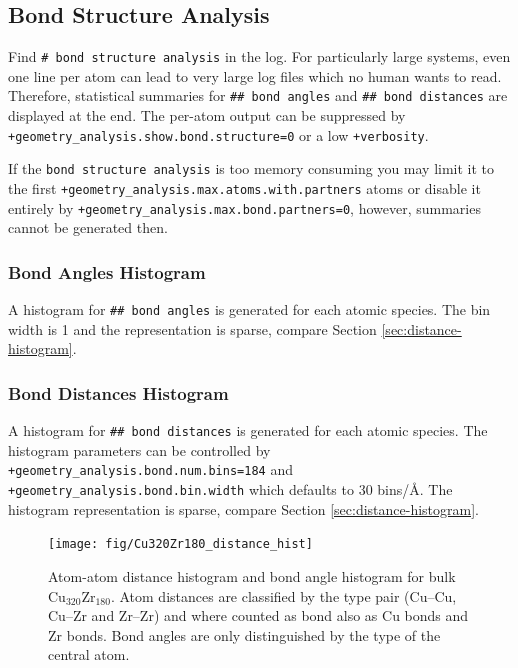 \documentclass[oribibl]{llncs}
\newcommand{\ttt}[1]{\texttt{#1}}
\begin{document}
\subsection{Bond Structure Analysis} \label{sec:bond-structure-analysis}
%
Find \ttt{\# bond structure analysis} in the log.
For particularly large systems, even one line per atom
can lead to very large log files which no human wants to read.
Therefore, statistical summaries 
for \ttt{\#\# bond angles} 
and \ttt{\#\# bond distances} are displayed at the end.
The per-atom output can be suppressed
by \ttt{+geometry\_analysis.show.bond.structure=0} or a low \ttt{+verbosity}.

\noindent
If the \ttt{bond structure analysis} is too memory consuming you may limit it to the first
\ttt{+geometry\_analysis.max.atoms.with.partners} atoms
or disable it entirely by \ttt{+geometry\_analysis.max.bond.partners=0},
however, summaries cannot be generated then.

\subsubsection{Bond Angles Histogram} \label{sec:bond-angle-histogram}
A histogram for \ttt{\#\# bond angles} is generated for each atomic species.
The bin width is 1\degree{} and the representation is sparse,
compare Section \ref{sec:distance-histogram}.

\subsubsection{Bond Distances Histogram} \label{sec:bond-distance-histogram}
A histogram for \ttt{\#\# bond distances} is generated for each atomic species.
The histogram parameters can be controlled by 
\ttt{+geometry\_analysis.bond.num.bins=184} and
\ttt{+geometry\_analysis.bond.bin.width} which defaults to $30$ bins/\AA{}.
The histogram representation is sparse, compare Section \ref{sec:distance-histogram}.
\begin{figure}[t]
	\centering
	\texttt{[image: fig/Cu320Zr180\_distance\_hist]}
	\label{fig:Cu320Zr180-distance-histogram}
	\caption{Atom-atom distance histogram and bond angle histogram for bulk Cu$_{320}$Zr$_{180}$. 
	         Atom distances are classified by the type pair (Cu--Cu, Cu--Zr and Zr--Zr)
	         and where counted as bond also as Cu bonds and Zr bonds.
	         Bond angles are only distinguished by the type of the central atom.}
\end{figure}
\end{document}

